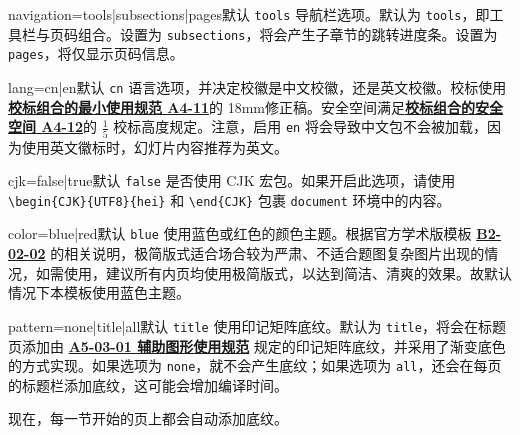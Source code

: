 \documentclass[a4paper,12pt]{article}
\begin{document}
\begin{CJK}{UTF8}{song}
\begin{docKey*}[SJTUBeamer]{navigation}{=tools|subsections|pages}{默认 \texttt{tools}}
    导航栏选项。默认为 \verb"tools"，即工具栏与页码组合。设置为 \verb"subsections"，将会产生子章节的跳转进度条。设置为 \verb"pages"，将仅显示页码信息。
\end{docKey*}

\begin{docKey*}[SJTUBeamer]{lang}{=cn|en}{默认 \texttt{cn}}
    语言选项，并决定校徽是中文校徽，还是英文校徽。校标使用\href{http://vi.sjtu.edu.cn/index.php/articles/base/4}{\textbf{校标组合的最小使用规范 A4-11}}的 18mm修正稿。安全空间满足\href{http://vi.sjtu.edu.cn/index.php/articles/base/4}{\textbf{校标组合的安全空间 A4-12}}的 $\frac{1}{5}$ 校标高度规定。注意，启用 \texttt{en} 将会导致中文包不会被加载，因为使用英文徽标时，幻灯片内容推荐为英文。
\end{docKey*}

\begin{docKey*}[SJTUBeamer]{cjk}{=false|true}{默认 \texttt{false}}
    是否使用 \textsf{CJK} 宏包。如果开启此选项，请使用 \verb"\begin{CJK}{UTF8}{hei}" 和 \verb"\end{CJK}" 包裹 \verb"document" 环境中的内容。
\end{docKey*}

\begin{docKey*}[SJTUBeamer]{color}{=blue|red}{默认 \texttt{blue}}
    使用蓝色或红色的颜色主题。根据官方学术版模板 \href{http://vi.sjtu.edu.cn/index.php/articles/app/8}{\textbf{B2-02-02}} 的相关说明，极简版式适合场合较为严肃、不适合题图复杂图片出现的情况，如需使用，建议所有内页均使用极简版式，以达到简洁、清爽的效果。故默认情况下本模板使用蓝色主题。
\end{docKey*}

\begin{docKey*}[SJTUBeamer]{pattern}{=none|title|all}{默认 \texttt{title}}
    使用印记矩阵底纹。默认为 \verb"title"，将会在标题页添加由 \href{http://vi.sjtu.edu.cn/index.php/articles/base/5}{\textbf{A5-03-01 辅助图形使用规范}} 规定的印记矩阵底纹，并采用了渐变底色的方式实现。如果选项为 \verb"none"，就不会产生底纹；如果选项为 \verb"all"，还会在每页的标题栏添加底纹，这可能会增加编译时间。

    现在，每一节开始的页上都会自动添加底纹。
\end{docKey*}


\end{CJK}
\end{document}
